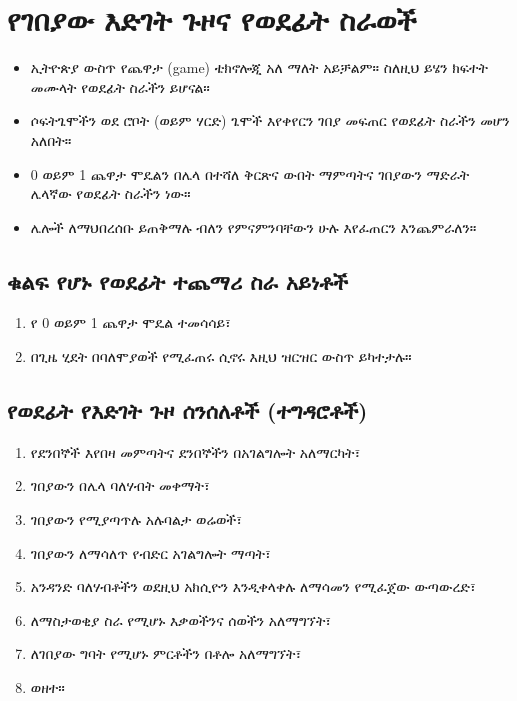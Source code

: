 \documentclass[a4paper,12pt]{article}
\newenvironment{geez}{\geezfont}{}
\begin{document}
\section{\begin{geez}የገበያው እድገት ጉዞና የወደፊት ስራወች\end{geez}}  
\begin{itemize}
\item ኢትዮጵያ ውስጥ የጨዋታ (game) ቴክኖሎጂ አለ ማለት አይቻልም። ስለዚህ ይሄን ክፍተት መሙላት የወደፊት ስራችን ይሆናል።
\item ሶፍትጌሞችን ወደ ሮቦት (ወይም ሃርድ) ጌሞች እየቀየርን ገበያ መፍጠር የወደፊት ስራችን መሆን አለበት።
\item 0 ወይም 1 ጨዋታ ሞዴልን በሌላ በተሻለ ቅርጽና ውበት ማምጣትና ገበያውን ማድራት ሌላኛው የወደፊት ስራችን ነው።
\item ሌሎች ለማህበረሰቡ ይጠቅማሉ ብለን የምናምንባቸውን ሁሉ እየፈጠርን እንጨምራለን።
\end{itemize}
\subsection{\begin{geez}ቁልፍ የሆኑ የወደፊት ተጨማሪ ስራ አይነቶች\end{geez}}  
\begin{enumerate}
\item የ 0 ወይም 1 ጨዋታ ሞዴል ተመሳሳይ፣
\item በጊዜ ሂደት በባለሞያወች የሚፈጠሩ ሲኖሩ እዚህ ዝርዝር ውስጥ ይካተታሉ።
\end{enumerate}
\subsection{\begin{geez}የወደፊት የእድገት ጉዞ ሰንሰለቶች (ተግዳሮቶች)\end{geez}}  
\begin{enumerate}
\item የደንበኞች እየበዛ መምጣትና ደንበኞችን በአገልግሎት አለማርካት፣
\item ገበያውን በሌላ ባለሃብት መቀማት፣
\item ገበያውን የሚያጣጥሉ አሉባልታ ወሬወች፣
\item ገበያውን ለማሳለጥ የብድር አገልግሎት ማጣት፣
\item አንዳንድ ባለሃብቶችን ወደዚህ አክሲዮን እንዲቀላቀሉ ለማሳመን የሚፈጀው ውጣውረድ፣
\item ለማስታወቂያ ስራ የሚሆኑ እቃወችንና ሰወችን አለማግኘት፣
\item ለገበያው ግባት የሚሆኑ ምርቶችን በቶሎ አለማግኘት፣
\item ወዘተ።
\end{enumerate}
\end{document}
